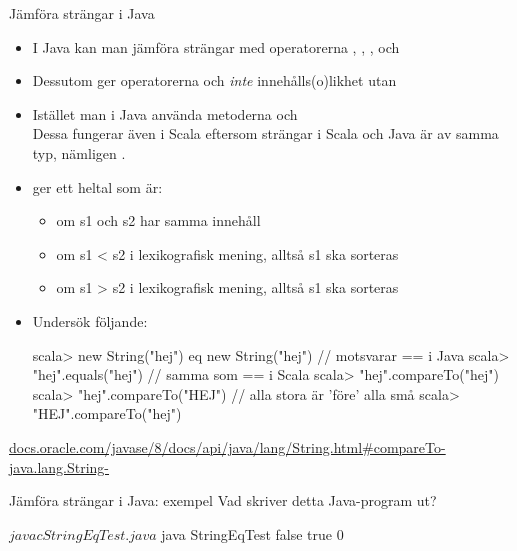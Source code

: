 \begin{Slide}{Jämföra strängar i Java}\SlideFontTiny
\begin{itemize}
\item I Java kan man  jämföra strängar med operatorerna \code{<}, \code{<=}, \code{>}, och \code{>=}

\item Dessutom ger operatorerna \code{==} och \code{!=} \emph{inte} innehålls(o)likhet utan  \code{:(}

\item Istället  man i Java använda metoderna  och 
\\Dessa fungerar även i Scala eftersom strängar i Scala och Java är av samma typ, nämligen .
\pause
\item {} ger ett heltal som är:
\begin{itemize}\SlideFontTiny
\item {} om s1 och s2 har samma innehåll
\item {} om s1 < s2 i lexikografisk mening, alltså s1 ska sorteras 
\item {} om s1 > s2 i lexikografisk mening, alltså s1 ska sorteras 
\end{itemize}

\pause
\item Undersök följande:
\begin{REPL}
scala> new String("hej") eq new String("hej") // motsvarar == i Java
scala> "hej".equals("hej")                    // samma som == i Scala
scala> "hej".compareTo("hej")
scala> "hej".compareTo("HEJ")         // alla stora är 'före' alla små
scala> "HEJ".compareTo("hej")
\end{REPL}
\end{itemize}

\href{http://docs.oracle.com/javase/8/docs/api/java/lang/String.html#compareTo-java.lang.String-}{docs.oracle.com/javase/8/docs/api/java/lang/String.html\#compareTo-java.lang.String-}
\end{Slide}


\begin{Slide}{Jämföra strängar i Java: exempel}\SlideFontSmall
Vad skriver detta Java-program ut?
\pause
\begin{REPL}
$ javac StringEqTest.java
$ java StringEqTest
false
true
0
\end{REPL}
\end{Slide}



